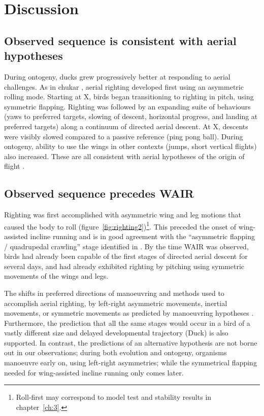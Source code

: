 \documentclass[10pt]{article}
\begin{document}
\section{Discussion}
\subsection{Observed sequence is consistent with aerial hypotheses}
During ontogeny, ducks grew progressively better at responding to aerial challenges.  As in chukar \cite{Evangelista:2014b}, aerial righting developed first using an asymmetric rolling mode.  Starting at X, birds began transitioning to righting in pitch, using symmetric flapping.  Righting was followed by an expanding suite of behaviours (yaws to preferred targets, slowing of descent, horizontal progress, and landing at preferred targets) along a continuum of directed aerial descent.  At X, descents were visibly slowed compared to a passive reference (ping pong ball).  During ontogeny, ability to use the wings in other contexts (jumps, short vertical flights) also increased.  These are all consistent with aerial hypotheses of the origin of flight \citep{Dudley:2011}. 

\subsection{Observed sequence precedes WAIR}
Righting was first accomplished with asymmetric wing and leg motions that caused the body to roll (figure~\ref{fig:righting2})\footnote{Roll-first may correspond to model test and stability results in chapter~\ref{ch:3}.}.  This preceded the onset of wing-assisted incline running and is in good agreement with the ``asymmetric flapping / quadrupedal crawling'' stage identified in \citep{Jackson:2009}.  By the time WAIR was observed, birds had already been capable of the first stages of directed aerial descent for several days, and had already exhibited righting by pitching using symmetric movements of the wings and legs. 

The shifts in preferred directions of manoeuvring and methods used to accomplish aerial righting, by left-right asymmetric movements, inertial movements, or symmetric movements as predicted by manoeuvring hypotheses \citep{Dudley:2011}.  Furthermore, the prediction that all the same stages would occur in a bird of a vastly different size and delayed developmental trajectory (Duck) is also supported.  In contrast, the predictions of an alternative hypothesis \citep{Dial:2003, Dial:2008, Tobalske:2011} are not borne out in our observations; during both evolution and ontogeny, organisms manoeuvre early on, using left-right asymmetries; while the symmetrical flapping needed for wing-assisted incline running only comes later.
\end{document}
